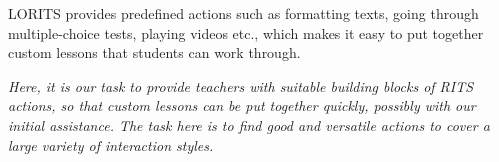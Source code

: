 \documentclass[a4paper,11pt]{article}
\begin{document}
LORITS provides predefined actions such as formatting texts, going
through multiple-choice tests, playing videos etc., which makes it
easy to put together custom lessons that students can work through.

\bigskip \textit{Here, it is our task to provide teachers with
  suitable building blocks of RITS actions, so that custom lessons can
  be put together quickly, possibly with our initial assistance. The
  task here is to find good and versatile actions to cover a large
  variety of interaction styles.}

\vfil
\end{document}
